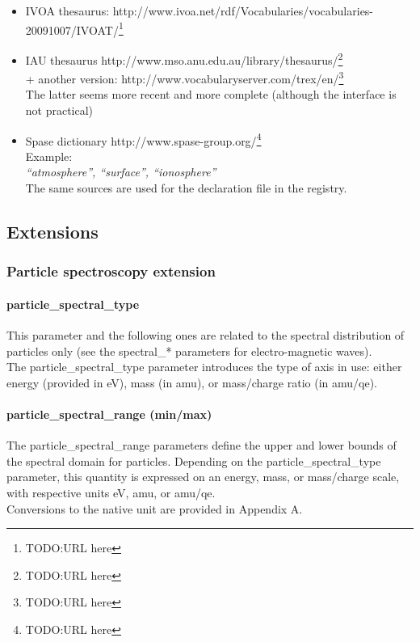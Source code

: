 \documentclass[11pt,a4paper]{ivoa}
\begin{document}
\begin{itemize}
\item IVOA thesaurus: http://www.ivoa.net/rdf/Vocabularies/vocabularies-20091007/IVOAT/\footnote{TODO:URL here}
\item IAU thesaurus http://www.mso.anu.edu.au/library/thesaurus/\footnote{TODO:URL here}\\ + another version: http://www.vocabularyserver.com/trex/en/\footnote{TODO:URL here}\\ The latter seems more recent and more complete (although the interface is not practical)
\item Spase dictionary http://www.spase-group.org/\footnote{TODO:URL here}\\Example: \\\emph{``atmosphere'', ``surface'', ``ionosphere''}\\ The same sources are used for the declaration file in the registry. 
\end{itemize}

\subsection{Extensions}

\subsubsection{Particle spectroscopy extension}

\paragraph{particle\_spectral\_type}

This parameter and the following ones are related to the spectral distribution of particles only (see the spectral\_* parameters for electro-magnetic waves).\\ The particle\_spectral\_type parameter introduces the type of axis in use: either energy (provided in eV), mass (in amu), or mass/charge ratio (in amu/qe).

\paragraph{particle\_spectral\_range (min/max)}

The particle\_spectral\_range parameters define the upper and lower bounds of the spectral domain for particles. Depending on the particle\_spectral\_type parameter, this quantity is expressed on an energy, mass, or mass/charge scale, with respective units eV, amu, or amu/qe. \\ Conversions to the native unit are provided in Appendix A.
\end{document}
